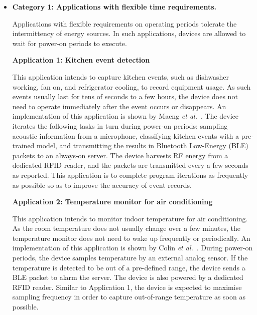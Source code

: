 \begin{itemize}

  \item \textbf{Category 1: Applications with flexible time requirements.}
  
  Applications with flexible requirements on operating periods tolerate the intermittency of energy sources. In such applications, devices are allowed to wait for power-on periods to execute.

  \textbf{Application 1: Kitchen event detection} 
  
  This application intends to capture kitchen events, such as dishwasher working, fan on, and refrigerator cooling, to record equipment usage. 
  As such events usually last for tens of seconds to a few hours, the device does not need to operate immediately after the event occurs or disappears. 
  An implementation of this application is shown by Maeng \textit{et al.}~\cite{maeng2019supporting}. 
  The device iterates the following tasks in turn during power-on periods: sampling acoustic information from a microphone, classifying kitchen events with a pre-trained model, and transmitting the results in Bluetooth Low-Energy (BLE) packets to an always-on server. 
  The device harvests RF energy from a dedicated RFID reader, and the packets are transmitted every a few seconds as reported. 
  This application is to complete program iterations as frequently as possible so as to improve the accuracy of event records. 

  \textbf{Application 2: Temperature monitor for air conditioning}

  This application intends to monitor indoor temperature for air conditioning. 
  As the room temperature does not usually change over a few minutes, the temperature monitor does not need to wake up frequently or periodically. 
  An implementation of this application is shown by Colin \textit{et al.}~\cite{colin2018reconfigurable}. 
  During power-on periods, the device samples temperature by an external analog sensor. 
  If the temperature is detected to be out of a pre-defined range, the device sends a BLE packet to alarm the server. 
  The device is also powered by a dedicated RFID reader. 
  Similar to Application 1, the device is expected to maximise sampling frequency in order to capture out-of-range temperature as soon as possible.


\end{itemize}
